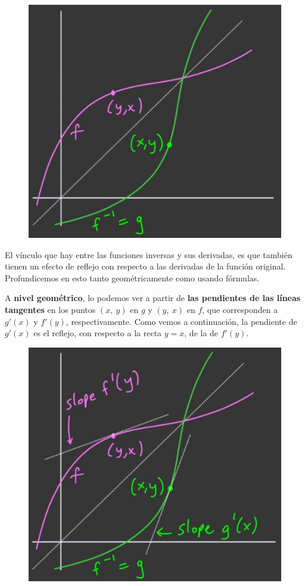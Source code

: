 \documentclass[12pt]{article}
\begin{document}
\begin{figure}[hbt!]
\centering
\includegraphics[scale=0.5]{img/rel-deriv-inv-fun.jpg}
\end{figure}

El vínculo que hay entre las funciones inversas y sus derivadas, es que también tienen un efecto de reflejo con respecto a las derivadas de la función original. Profundicemos en esto tanto geométricamente como usando fórmulas.

A \textbf{nivel geométrico}, lo podemos ver a partir de \textbf{las pendientes de las líneas tangentes} en los puntos $(x, \ y)$ en $g$ y $(y, \ x)$ en $f$, que corresponden a $g'(x)$ y $f'(y)$, respectivamente. Como vemos a continuación, la pendiente de $g'(x)$ es el reflejo, con respecto a la recta $y = x$, de la de $f'(y)$.

\begin{figure}[hbt!]
\centering
\includegraphics[scale=0.5]{img/rel-deriv-inv-fun-2.jpg}
\end{figure}
\end{document}
